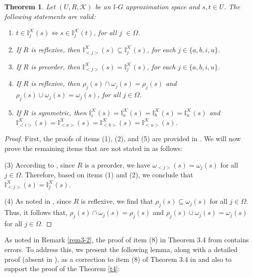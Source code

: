 \documentclass{article}
\theoremstyle{theorem}
\newtheorem{theorem}{Theorem}[section]
\theoremstyle{definition}
\theoremstyle{remark}
\begin{document}
\begin{theorem}\label{t3} Let $(U, R, \mathcal{K})$ be an $\mathbb{I}$-$G$ approximation space and $s, t\in U$. The following statements are valid:
\begin{enumerate}
\item  $ t\in \mathbb{I}^{\mathcal{K}}_{j}(s) \Leftrightarrow s \in \mathbb{I}^{\mathcal{K}}_{j}(t)$, for all $j$ $ \in \Omega$.
\item  If $R$ is reflexive, then $\mathbb{I}^{\mathcal{K}}_{<j>}(s)\subseteq \mathbb{I}^{\mathcal{K}}_{j}(s)$, for each $j \in \{a, b, i, u\}$.
\item  If $R$ is preorder, then $\mathbb{I}^{\mathcal{K}}_{<j>}(s)=\mathbb{I}^{\mathcal{K}}_{j}(s)$, for each $j \in \{a, b, i, u\}$.
\item  If $R$ is reflexive, then $\rho_{j}(s) \cap \omega_{j}(s) = \rho_{j}(s)$ and $\rho_{j}(s) \cup \omega_{j}(s) = \omega_{j}(s)$, for all $j \in \Omega$.
\item  If $R$ is symmetric, then $\mathbb{I}^{\mathcal{K}}_{i}(s) = \mathbb{I}^{\mathcal{K}}_{a}(s) = \mathbb{I}^{\mathcal{K}}_{b}(s) = \mathbb{I}^{\mathcal{K}}_{u}(s)$ and $\mathbb{I}^{\mathcal{K}}_{<i>}(s) = \mathbb{I}^{\mathcal{K}}_{<a>}(s) = \mathbb{I}^{\mathcal{K}}_{<b>}(s) = \mathbb{I}^{\mathcal{K}}_{<u>}(s)$.
\end{enumerate}
\end{theorem}
\begin{proof}
First, the proofs of items (1), (2), and (5) are provided in \cite{Al-shami 2024}. We will now prove the remaining items that are not stated in \cite{Al-shami 2024} as follows:

\noindent (3) According to \cite{Abu Gdairi 2024},  since $R$ is a preorder, we have $\omega_{<j>}(s) = \omega_{j}(s)$ for all $j \in \Omega$. Therefore, based on items (1) and (2), we conclude that $\mathbb{I}^{\mathcal{K}}_{<j>}(s) = \mathbb{I}^{\mathcal{K}}_{j}(s)$.

\noindent (4) As noted in  \cite{El-Bably 2021}, since $R$ is reflexive, we find that $\rho_{j}(s) \subseteq \omega_{j}(s)$ for all $j \in \Omega$. Thus, it follows that, $\rho_{j}(s) \cap \omega_{j}(s) = \rho_{j}(s)$ and $\rho_{j}(s) \cup \omega_{j}(s) = \omega_{j}(s)$ for all $j \in \Omega$.
\end{proof}

As noted in Remark \ref{rem3-2}, the proof of item (8) in Theorem 3.4 from \cite{Al-shami 2024} contains errors. To address this, we present the following lemma, along with a detailed proof (absent in \cite{Al-shami 2024}), as a correction to item (8) of Theorem 3.4 in \cite{Al-shami 2024} and also to support the proof of the Theorem \ref{t4}:
\end{document}
